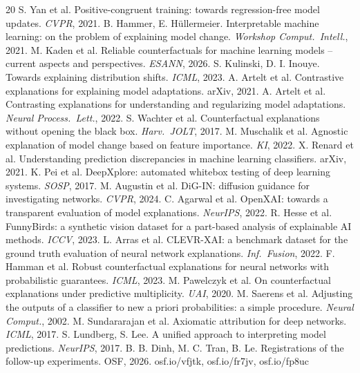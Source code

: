 \documentclass{esannV2}
\begin{document}
\begin{footnotesize}
\begin{thebibliography}{20}
\setlength{\itemsep}{0pt}\setlength{\parskip}{0pt}
S. Yan et al. Positive-congruent training: towards regression-free model updates. \emph{CVPR}, 2021.
B. Hammer, E. H\"ullermeier. Interpretable machine learning: on the problem of explaining model change. \emph{Workshop Comput.\ Intell.}, 2021.
M. Kaden et al. Reliable counterfactuals for machine learning models -- current aspects and perspectives. \emph{ESANN}, 2026.
S. Kulinski, D. I. Inouye. Towards explaining distribution shifts. \emph{ICML}, 2023.
A. Artelt et al. Contrastive explanations for explaining model adaptations. arXiv, 2021.
A. Artelt et al. Contrasting explanations for understanding and regularizing model adaptations. \emph{Neural Process.\ Lett.}, 2022.
S. Wachter et al. Counterfactual explanations without opening the black box. \emph{Harv.\ JOLT}, 2017.
M. Muschalik et al. Agnostic explanation of model change based on feature importance. \emph{KI}, 2022.
X. Renard et al. Understanding prediction discrepancies in machine learning classifiers. arXiv, 2021.
K. Pei et al. DeepXplore: automated whitebox testing of deep learning systems. \emph{SOSP}, 2017.
M. Augustin et al. DiG-IN: diffusion guidance for investigating networks. \emph{CVPR}, 2024.
C. Agarwal et al. OpenXAI: towards a transparent evaluation of model explanations. \emph{NeurIPS}, 2022.
R. Hesse et al. \mbox{FunnyBirds}: a synthetic vision dataset for a part-based analysis of explainable AI methods. \emph{ICCV}, 2023.
L. Arras et al. CLEVR-XAI: a benchmark dataset for the ground truth evaluation of neural network explanations. \emph{Inf.\ Fusion}, 2022.
F. Hamman et al. Robust counterfactual explanations for neural networks with probabilistic guarantees. \emph{ICML}, 2023.
M. Pawelczyk et al. On counterfactual explanations under predictive multiplicity. \emph{UAI}, 2020.
M. Saerens et al. Adjusting the outputs of a classifier to new a priori probabilities: a simple procedure. \emph{Neural Comput.}, 2002.
M. Sundararajan et al. Axiomatic attribution for deep networks. \emph{ICML}, 2017.
S. Lundberg, S. Lee. A unified approach to interpreting model predictions. \emph{NeurIPS}, 2017.
B. B. Dinh, M. C. Tran, B. Le. Registrations of the follow-up experiments. OSF, 2026. osf.io/vfjtk, osf.io/fr7jv, osf.io/fp8uc
\end{thebibliography}
\end{footnotesize}
\end{document}
